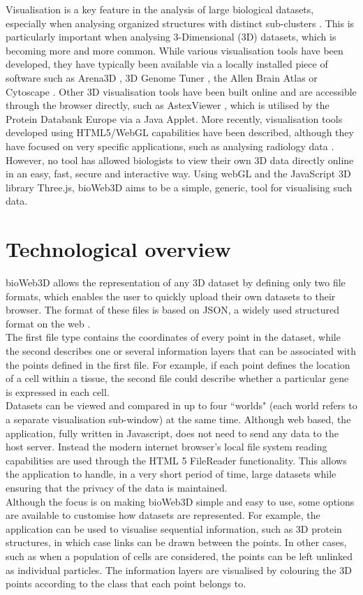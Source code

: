 \documentclass{bioinfo}
\begin{document}
Visualisation is a key feature in the analysis of large biological datasets, especially when analysing organized structures with distinct sub-clusters \citep{Rubel10}. This is particularly important when analysing 3-Dimensional (3D) datasets, which is becoming more and more common. While various visualisation tools have been developed, they have typically been available via a locally installed piece of software such as Arena3D \citep{Pavlopoulos08},  3D Genome Tuner \citep{Wang09}, the Allen Brain Atlas \citep{Lein07} or Cytoscape \citep{Shannon03}. Other 3D visualisation tools have been built online and are accessible through the browser directly, such as AstexViewer \citep{Hartshorn02}, which is utilised by the Protein Databank Europe via a Java Applet. More recently, visualisation tools developed using HTML5/WebGL capabilities have been described, although they have focused on very specific applications, such as analysing radiology data  \citep{Dinesh12}. However, no tool has allowed biologists to view their own 3D data directly online in an easy, fast, secure and interactive way. Using webGL and the JavaScript 3D library Three.js, bioWeb3D aims to be a simple, generic, tool for visualising such data.



\section{Technological overview}

bioWeb3D allows the representation of any 3D dataset by defining only two file formats, which enables the user to quickly upload their own datasets to their browser. The format of these files is based on JSON, a widely used structured format on the web \citep{Wilde07}.\\
The first file type contains the coordinates of every point in the dataset, while the second describes one or several information layers that can be associated with the points defined in the first file. For example, if each point defines the location of a cell within a tissue, the second file could describe whether a particular gene is expressed in each cell. \\
Datasets can be viewed and compared in up to four ``worlds" (each world refers to a separate visualisation sub-window) at the same time. Although web based, the application, fully written in Javascript, does not need to send any data to the host server. Instead the modern internet browser's local file system reading capabilities are used through the HTML 5 FileReader functionality. This allows the application to handle, in a very short period of time, large datasets while ensuring that the privacy of the data is maintained.\\
Although the focus is on making bioWeb3D simple and easy to use, some options are available to customise how datasets are represented. For example, the application can be used to visualise sequential information, such as 3D protein structures, in which case links can be drawn between the points. In other cases, such as when a population of cells are considered, the points can be left unlinked as individual particles. The information layers are visualised by colouring the 3D points according to the class that each point belongs to.
\end{document}
